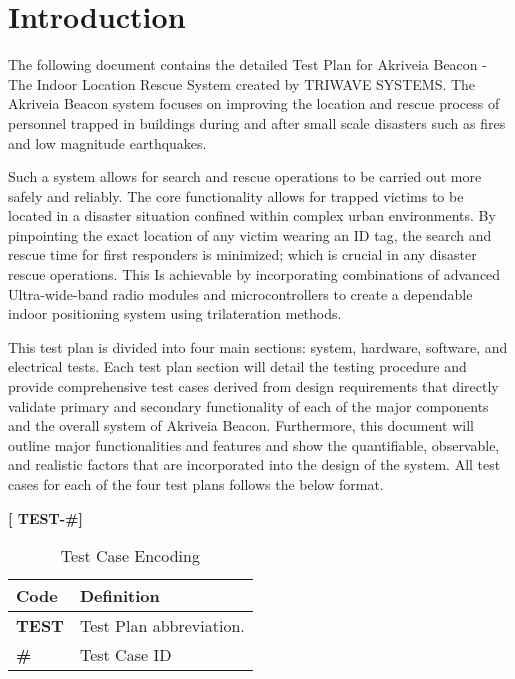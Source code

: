 

\setcounter{section}{0}
\section{Introduction}
\bigskip

The following document contains the detailed Test Plan for Akriveia Beacon - The Indoor Location Rescue System created by TRIWAVE SYSTEMS. The Akriveia Beacon system focuses on improving the location and rescue process of personnel trapped in buildings during and after small scale disasters such as fires and low magnitude earthquakes. 

\bigskip
Such a system allows for search and rescue operations to be carried out more safely and reliably. The core functionality allows for trapped victims to be located  in a disaster situation confined within complex urban environments.  By pinpointing the exact location of any victim wearing an ID tag, the search and rescue time for first responders is minimized; which is crucial in any disaster rescue operations. This Is achievable by incorporating combinations of advanced Ultra-wide-band radio modules and microcontrollers to create a dependable indoor positioning system using trilateration methods. 

\bigskip
This test plan is divided into four main sections: system, hardware, software, and electrical tests. Each test plan section will detail the testing procedure and provide comprehensive test cases derived from design requirements that directly validate primary and secondary functionality of each of the major components and the overall system of Akriveia Beacon. Furthermore, this document will outline major functionalities and features and show the quantifiable, observable, and realistic factors that are incorporated into the design of the system. All test cases for each of the four test plans follows the below format.

\medskip
\begin{center}
	\textbf{[ TEST-\#]} 
\end{center}


\bgroup
\def\arraystretch{1.3}
\begin{table}[H]
\centering
\begin{tabular}{ | m{1cm} | m{13cm}| } 
\hline
\rowcolor{lightgray} \textbf{Code} & \textbf{Definition} \\ 
\hline
 \textbf{TEST} & Test Plan abbreviation. \\ 
\hline
 \textbf{\#} & Test Case ID \\ 
\hline
\end{tabular}
\caption{Test Case Encoding}
\end{table}

